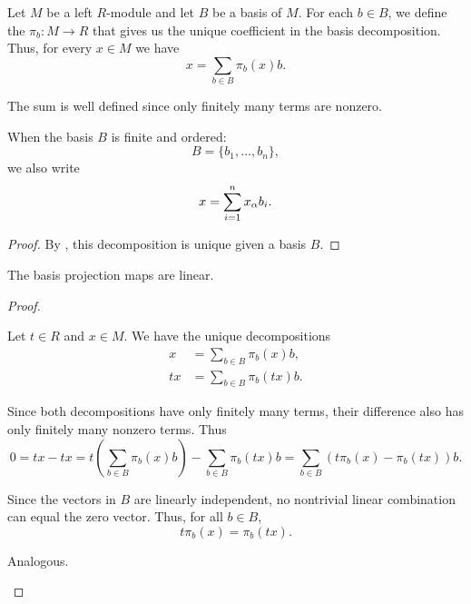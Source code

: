\begin{definition}\label{def:left_module_basis_projection}
  Let \( M \) be a left \( R \)-module and let \( B \) be a basis of \( M \). For each \( b \in B \), we define the  \( \pi_b: M \to R \) that gives us the unique coefficient in the basis decomposition. Thus, for every \( x \in M \) we have
  \begin{equation*}
    x = \sum_{b \in B} \pi_b(x) b.
  \end{equation*}

  The sum is well defined since only finitely many terms are nonzero.

  When the basis \( B \) is finite and ordered:
  \begin{equation*}
    B = \{ b_1, \ldots, b_n \},
  \end{equation*}
  we also write
  \begin{equation*}
    x = \sum_{i=1}^n x_\alpha b_i.
  \end{equation*}
\end{definition}
\begin{proof}
  By , this decomposition is unique given a basis \( B \).
\end{proof}

\begin{proposition}\label{thm:left_module_basis_projections_are_linear}
  The basis projection maps are linear.
\end{proposition}
\begin{proof}\mbox{}
  \begin{description}
     Let \( t \in R \) and \( x \in M \). We have the unique decompositions
    \begin{align*}
      x &= \sum_{b \in B} \pi_b(x) b, \\
      tx &= \sum_{b \in B} \pi_b(tx) b.
    \end{align*}

    Since both decompositions have only finitely many terms, their difference also has only finitely many nonzero terms. Thus
    \begin{equation*}
      0
      =
      tx - tx
      =
      t \left( \sum_{b \in B} \pi_b(x) b \right) - \sum_{b \in B} \pi_b(tx) b
      =
      \sum_{b \in B} (t \pi_b(x) - \pi_b(tx)) b.
    \end{equation*}

    Since the vectors in \( B \) are linearly independent, no nontrivial linear combination can equal the zero vector. Thus, for all \( b \in B \),
    \begin{equation*}
      t \pi_b(x) = \pi_b(tx).
    \end{equation*}

     Analogous.
  \end{description}
\end{proof}

